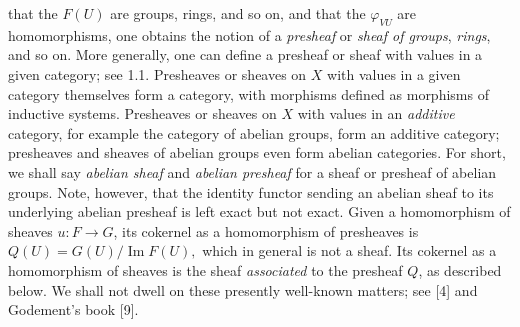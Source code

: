 
\noindent that the $F(U)$ are groups, rings, and so on, and that the
$\varphi_{VU}$ are homomorphisms, one obtains the notion of a \textit{presheaf} or
\textit{sheaf of groups}, \textit{rings}, and so on. More generally, one can define a presheaf
or sheaf with values in a given category; see 1.1. Presheaves or sheaves on
$X$ with values in a given category themselves form a category, with
morphisms defined as morphisms of inductive systems. Presheaves or sheaves on
$X$ with values in an \textit{additive} category, for example the category of abelian
groups, form an additive category; presheaves and sheaves of abelian groups
even form abelian categories. For short, we shall say \textit{abelian sheaf}
and \textit{abelian presheaf} for a sheaf or presheaf of abelian groups.
Note, however, that the identity functor sending an abelian sheaf to its
underlying abelian presheaf is left exact but not exact. Given a homomorphism
of sheaves $u:F\to G$, its cokernel as a homomorphism of
presheaves is
$Q(U)=G(U)/\operatorname{Im}F(U),$
which in general is not a sheaf. Its cokernel as a homomorphism of sheaves is
the sheaf \textit{associated} to the presheaf $Q$, as described below. We shall not
dwell on these presently well-known matters; see [4] and Godement's book [9].

